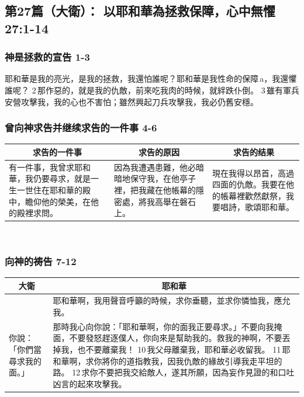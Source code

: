 \subsection{第27篇（大衛）： 以耶和華為拯救保障，心中無懼 27:1-14}
\subsubsection{神是拯救的宣告 1-3}
耶和華是我的亮光，是我的拯救，我還怕誰呢？耶和華是我性命的保障 a，我還懼誰呢？
2 那作惡的，就是我的仇敵，前來吃我肉的時候，就絆跌仆倒。
3 雖有軍兵安營攻擊我，我的心也不害怕；雖然興起刀兵攻擊我，我必仍舊安穩。
\subsubsection{曾向神求告并继续求告的一件事 4-6}
\begin{table}[H]
\centering
\begin{tabular}{p{5.75cm}|p{5.2500cm}|p{5.00cm}}\hline\hline
\multicolumn{1}{c|}{求告的一件事}&\multicolumn{1}{c|}{求告的原因}&\multicolumn{1}{c}{求告的结果}\\\hline
有一件事，我曾求耶和華，我仍要尋求，就是一生一世住在耶和華的殿中，瞻仰他的榮美，在他的殿裡求問。
&因為我遭遇患難，他必暗暗地保守我，在他亭子裡，把我藏在他帳幕的隱密處，將我高舉在磐石上。
&現在我得以昂首，高過四面的仇敵。我要在他的帳幕裡歡然獻祭，我要唱詩，歌頌耶和華。\\\hline
\end{tabular}
\end{table} 
\subsubsection{向神的祷告 7-12}
\begin{table}[H]
\centering
\begin{tabular}{p{2cm}|p{14.75cm}}\hline\hline
\multicolumn{1}{c|}{大衛}&\multicolumn{1}{c}{耶和華}\\\hline
&耶和華啊，我用聲音呼籲的時候，求你垂聽，並求你憐恤我，應允我。\\\hline
你說：「你們當尋求我的面。」&那時我心向你說：「耶和華啊，你的面我正要尋求。」不要向我掩面，不要發怒趕逐僕人，你向來是幫助我的。救我的神啊，不要丟掉我，也不要離棄我！
10 我父母離棄我，耶和華必收留我。
11 耶和華啊，求你將你的道指教我，因我仇敵的緣故引導我走平坦的路。
12 求你不要把我交給敵人，遂其所願，因為妄作見證的和口吐凶言的起來攻擊我。\\\hline
\end{tabular}
\end{table} 

